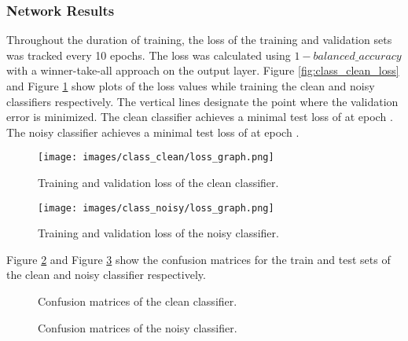 \documentclass[a4paper, 12pt, titlepage]{article}
\newcommand{\figRef}[1]{Figure \ref{#1}}
\begin{document}
  \subsubsection{Network Results}
  \par Throughout the duration of training, the loss of the training and
  validation sets was tracked every 10 epochs.
  The loss was calculated using $1 - balanced\_accuracy$ with a winner-take-all
  approach on the output layer.
  \figRef{fig:class_clean_loss} and \figRef{fig:class_noisy_loss} show plots of
  the loss values while training the clean and noisy classifiers respectively.
  The vertical lines designate the point where the validation error is
  minimized.
  The clean classifier achieves a minimal test loss of
  \unskip{} at epoch
  \unskip{}.
  The noisy classifier achieves a minimal test loss of
  \unskip{} at epoch
  \unskip{}.
  \begin{figure}[htb]
    \begin{minipage}{0.45\textwidth}
      \centering
      \texttt{[image: images/class\_clean/loss\_graph.png]}
      \caption{Training and validation loss of the clean classifier.}
      \label{fig:class_clean_loss}
    \end{minipage}
    \hfill
    \begin{minipage}{0.45\textwidth}
      \centering
      \texttt{[image: images/class\_noisy/loss\_graph.png]}
      \caption{Training and validation loss of the noisy classifier.}
      \label{fig:class_noisy_loss}
    \end{minipage}
  \end{figure}
  \par \figRef{fig:conf_clean} and \figRef{fig:conf_noisy} show the confusion
  matrices for the train and test sets of the clean and noisy classifier
  respectively.
  \begin{figure}[p]
    \centering
    \caption{Confusion matrices of the clean classifier.}
    \label{fig:conf_clean}
  \end{figure}
  \begin{figure}[p]
    \centering
    \caption{Confusion matrices of the noisy classifier.}
    \label{fig:conf_noisy}
  \end{figure}
\end{document}
